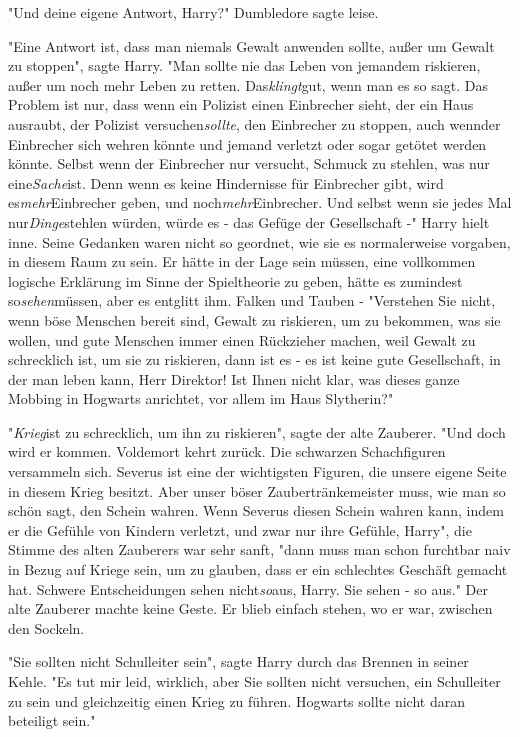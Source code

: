 {"Und deine eigene Antwort, Harry?" Dumbledore sagte leise.

"Eine Antwort ist, dass man niemals Gewalt anwenden sollte, außer um Gewalt zu stoppen", sagte Harry. "Man sollte nie das Leben von jemandem riskieren, außer um noch mehr Leben zu retten. Das\emph{klingt}gut, wenn man es so sagt. Das Problem ist nur, dass wenn ein Polizist einen Einbrecher sieht, der ein Haus ausraubt, der Polizist versuchen\emph{sollte}, den Einbrecher zu stoppen, auch wennder Einbrecher sich wehren könnte und jemand verletzt oder sogar getötet werden könnte. Selbst wenn der Einbrecher nur versucht, Schmuck zu stehlen, was nur eine\emph{Sache}ist. Denn wenn es keine Hindernisse für Einbrecher gibt, wird es\emph{mehr}Einbrecher geben, und noch\emph{mehr}Einbrecher. Und selbst wenn sie jedes Mal nur\emph{Dinge}stehlen würden, würde es - das Gefüge der Gesellschaft -" Harry hielt inne. Seine Gedanken waren nicht so geordnet, wie sie es normalerweise vorgaben, in diesem Raum zu sein. Er hätte in der Lage sein müssen, eine vollkommen logische Erklärung im Sinne der Spieltheorie zu geben, hätte es zumindest so\emph{sehen}müssen, aber es entglitt ihm. Falken und Tauben - "Verstehen Sie nicht, wenn böse Menschen bereit sind, Gewalt zu riskieren, um zu bekommen, was sie wollen, und gute Menschen immer einen Rückzieher machen, weil Gewalt zu schrecklich ist, um sie zu riskieren, dann ist es - es ist keine gute Gesellschaft, in der man leben kann, Herr Direktor! Ist Ihnen nicht klar, was dieses ganze Mobbing in Hogwarts anrichtet, vor allem im Haus Slytherin?"

"\emph{Krieg}ist zu schrecklich, um ihn zu riskieren", sagte der alte Zauberer. "Und doch wird er kommen. Voldemort kehrt zurück. Die schwarzen Schachfiguren versammeln sich. Severus ist eine der wichtigsten Figuren, die unsere eigene Seite in diesem Krieg besitzt. Aber unser böser Zaubertränkemeister muss, wie man so schön sagt, den Schein wahren. Wenn Severus diesen Schein wahren kann, indem er die Gefühle von Kindern verletzt, und zwar nur ihre Gefühle, Harry", die Stimme des alten Zauberers war sehr sanft, "dann muss man schon furchtbar naiv in Bezug auf Kriege sein, um zu glauben, dass er ein schlechtes Geschäft gemacht hat. Schwere Entscheidungen sehen nicht\emph{so}aus, Harry. Sie sehen - so aus." Der alte Zauberer machte keine Geste. Er blieb einfach stehen, wo er war, zwischen den Sockeln.

"Sie sollten nicht Schulleiter sein", sagte Harry durch das Brennen in seiner Kehle. "Es tut mir leid, wirklich, aber Sie sollten nicht versuchen, ein Schulleiter zu sein und gleichzeitig einen Krieg zu führen. Hogwarts sollte nicht daran beteiligt sein."

}
